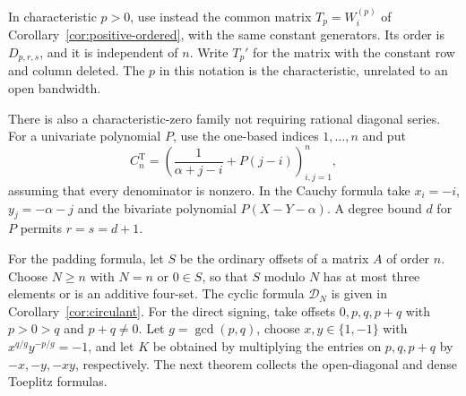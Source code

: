 \documentclass[11pt,reqno]{amsart}
\theoremstyle{remark}
\numberwithin{equation}{section}
\begin{document}
In characteristic \(p>0\), use instead the common matrix
\(T_p=W_i^{(p)}\) of Corollary~\ref{cor:positive-ordered}, with
the same constant generators. Its order is \(D_{p,r,s}\), and
it is independent of \(n\). Write \(T_p'\) for the matrix with
the constant row and column deleted. The \(p\) in this notation
is the characteristic, unrelated to an open bandwidth.

There is also a characteristic-zero family not requiring rational
diagonal series. For a univariate polynomial \(P\), use the
one-based indices \(1,\ldots,n\) and put
\[
 C_n^{\mathrm T}=\left(\frac1{\alpha+j-i}+P(j-i)\right)_{i,j=1}^n,
\]
assuming that every denominator is nonzero. In the Cauchy formula
take \(x_i=-i\), \(y_j=-\alpha-j\) and the bivariate polynomial
\(P(X-Y-\alpha)\). A degree bound \(d\) for \(P\) permits
\(r=s=d+1\).

For the padding formula, let \(S\) be the ordinary offsets
of a matrix \(A\) of order \(n\). Choose \(N\ge n\) with \(N=n\)
or \(0\in S\), so that \(S\) modulo \(N\) has at most three
elements or is an additive four-set. The cyclic formula
\(\mathcal D_N\) is given in Corollary~\ref{cor:circulant}.
For the direct signing, take offsets \(0,p,q,p+q\) with
\(p>0>q\) and \(p+q\ne0\). Let \(g=\gcd(p,q)\), choose
\(x,y\in\{1,-1\}\) with \(x^{q/g}y^{-p/g}=-1\), and let
\(K\) be obtained by multiplying the entries on \(p,q,p+q\)
by \(-x,-y,-xy\), respectively. The next theorem collects the open-diagonal and dense
Toeplitz formulas.
\end{document}
